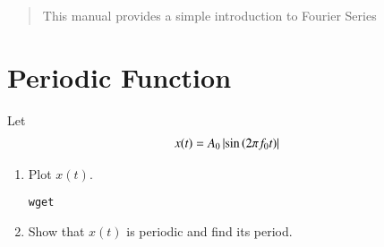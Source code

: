 \documentclass[journal,12pt,twocolumn]{IEEEtran}
\renewcommand\thesection{\arabic{section}}
\begin{document}
% 







\maketitle


\tableofcontents


\renewcommand{\thefigure}{\theenumi}
\renewcommand{\thetable}{\theenumi}



\bigskip

\begin{abstract}
This manual provides a simple introduction to Fourier Series
\end{abstract}
\section{Periodic Function}
Let 
\begin{align}
	x(t) &= A_0\left\vert\sin\left(2\pi f_0 t\right)\right\vert
	\label{eq:10-orig-diff-def}
\end{align}
\begin{enumerate}[label=\thesection.\arabic*
,ref=\thesection.\theenumi]
\item Plot $x(t)$.\\
\solution 
\begin{lstlisting}
wget 
\end{lstlisting}
\item Show that $x(t)$ is periodic and find its period.
\end{enumerate}
\end{document}
